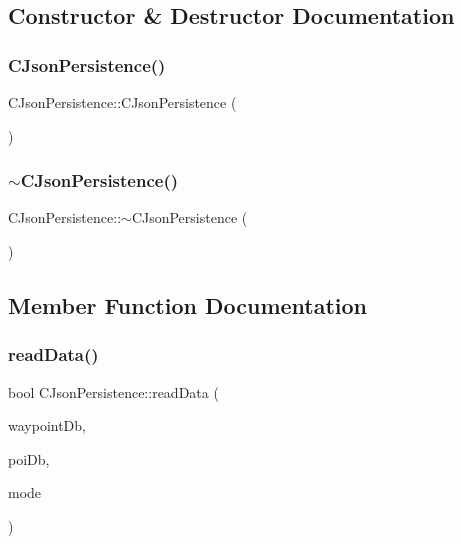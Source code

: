 \subsection{Constructor \& Destructor Documentation}
\mbox{\label{classCJsonPersistence_a4ecc6567fdd9d7f76ea3f53bbfd27a04}} 
\subsubsection{\texorpdfstring{C\+Json\+Persistence()}{CJsonPersistence()}}
{\footnotesize\ttfamily C\+Json\+Persistence\+::\+C\+Json\+Persistence (\begin{DoxyParamCaption}{ }\end{DoxyParamCaption})}

\mbox{\label{classCJsonPersistence_a4540b65d9b71826f3efa0342e9dc0f08}} 
\subsubsection{\texorpdfstring{$\sim$\+C\+Json\+Persistence()}{~CJsonPersistence()}}
{\footnotesize\ttfamily C\+Json\+Persistence\+::$\sim$\+C\+Json\+Persistence (\begin{DoxyParamCaption}{ }\end{DoxyParamCaption})\hspace{0.3cm}{\ttfamily [virtual]}}



\subsection{Member Function Documentation}
\mbox{\label{classCJsonPersistence_a433ddbf7f66175f38f549dbedcbb1e93}} 
\subsubsection{\texorpdfstring{read\+Data()}{readData()}}
{\footnotesize\ttfamily bool C\+Json\+Persistence\+::read\+Data (\begin{DoxyParamCaption}\item[{\hyperlink{classCWpDatabase}{C\+Wp\+Database} \&}]{waypoint\+Db,  }\item[{\hyperlink{classCPoiDatabase}{C\+Poi\+Database} \&}]{poi\+Db,  }\item[{\hyperlink{classCPersistentStorage_a9b9929a4afa6e21da10f4a2e926a4584}{Merge\+Mode}}]{mode }\end{DoxyParamCaption})\hspace{0.3cm}{\ttfamily [virtual]}}


